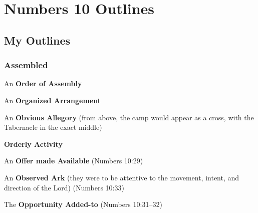 \section{Numbers 10 Outlines}

\subsection{My Outlines}

\subsubsection{Assembled}
\begin{compactenum}[I.][7]
    \item An \textbf{Order of Assembly} %
    \item An \textbf{Organized Arrangement}  %
    \item An \textbf{Obvious Allegory}  (from above, the camp would appear as a cross, with the Tabernacle in the exact middle)%
    \item \textbf{Orderly Activity}  %
    \item An \textbf{Offer made Available}   (Numbers 10:29)
    \item An \textbf{Observed Ark}  (they were to be attentive to the movement, intent, and direction of the Lord)  (Numbers 10:33)
    \item The \textbf{Opportunity Added-to}   (Numbers 10:31--32)
\end{compactenum}

